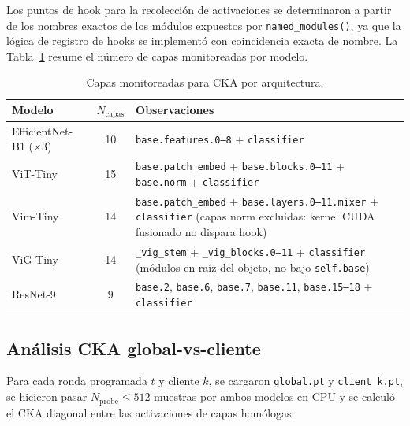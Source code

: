 Los puntos de hook para la recolección de activaciones se determinaron a partir de los
nombres exactos de los módulos expuestos por \texttt{named\_modules()}, ya que la lógica de
registro de hooks se implementó con coincidencia exacta de nombre. La
Tabla~\ref{tab:cka_layers} resume el número de capas monitoreadas por modelo.

\begin{table}[H]
\centering
\caption{Capas monitoreadas para CKA por arquitectura.}
\label{tab:cka_layers}

\begin{tabularx}{\textwidth}{l c X}
\hline
Modelo & $N_{\text{capas}}$ & Observaciones \\
\hline

EfficientNet-B1 (×3) & 10 &
\texttt{base.features.0--8} + \texttt{classifier} \\

ViT-Tiny & 15 &
\texttt{base.patch\_embed} + \texttt{base.blocks.0--11} +
\texttt{base.norm} + \texttt{classifier} \\

Vim-Tiny & 14 &
\texttt{base.patch\_embed} + \texttt{base.layers.0--11.mixer} +
\texttt{classifier} \newline
(capas norm excluidas: kernel CUDA fusionado no dispara hook) \\

ViG-Tiny & 14 &
\texttt{\_vig\_stem} + \texttt{\_vig\_blocks.0--11} +
\texttt{classifier} \newline
(módulos en raíz del objeto, no bajo \texttt{self.base}) \\

ResNet-9 & 9 &
\texttt{base.2}, \texttt{base.6}, \texttt{base.7},
\texttt{base.11}, \texttt{base.15--18} +
\texttt{classifier} \\

\hline
\end{tabularx}
\end{table}

\subsection{Análisis CKA global-vs-cliente}

Para cada ronda programada $t$ y cliente $k$, se cargaron \texttt{global.pt} y
\texttt{client\_k.pt}, se hicieron pasar $N_{\text{probe}} \leq 512$ muestras por ambos
modelos en CPU y se calculó el CKA diagonal entre las activaciones de capas homólogas:

